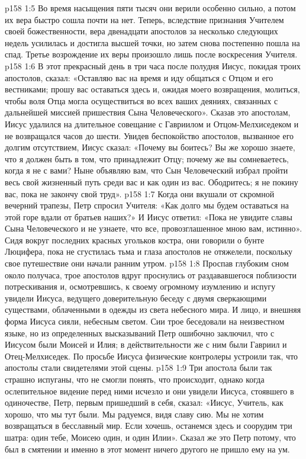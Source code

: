 \vs p158 1:5 Во время насыщения пяти тысяч они верили особенно сильно, а потом их вера быстро сошла почти на нет. Теперь, вследствие признания Учителем своей божественности, вера двенадцати апостолов за несколько следующих недель усилилась и достигла высшей точки, но затем снова постепенно пошла на спад. Третье возрождение их веры произошло лишь после воскресения Учителя.
\vs p158 1:6 В этот прекрасный день в три часа после полудня Иисус, покидая троих апостолов, сказал: «Оставляю вас на время и иду общаться с Отцом и его вестниками; прошу вас оставаться здесь и, ожидая моего возвращения, молиться, чтобы воля Отца могла осуществиться во всех ваших деяниях, связанных с дальнейшей миссией пришествия Сына Человеческого». Сказав это апостолам, Иисус удалился на длительное совещание с Гавриилом и Отцом\hyp{}Мелхиседеком и не возвращался часов до шести. Увидев беспокойство апостолов, вызванное его долгим отсутствием, Иисус сказал: «Почему вы боитесь? Вы же хорошо знаете, что я должен быть в том, что принадлежит Отцу; почему же вы сомневаетесь, когда я не с вами? Ныне объявляю вам, что Сын Человеческий избрал пройти весь свой жизненный путь среди вас и как один из вас. Ободритесь; я не покину вас, пока не закончу свой труд».
\vs p158 1:7 Когда они вкушали от скромной вечерний трапезы, Петр спросил Учителя: «Как долго мы будем оставаться на этой горе вдали от братьев наших?» И Иисус ответил: «Пока не увидите славы Сына Человеческого и не узнаете, что все, провозглашенное мною вам, истинно». Сидя вокруг последних красных угольков костра, они говорили о бунте Люцифера, пока не сгустилась тьма и глаза апостолов не отяжелели, поскольку свое путешествие они начали ранним утром.
\vs p158 1:8 Проспав глубоким сном около получаса, трое апостолов вдруг проснулись от раздававшегося поблизости потрескивания и, осмотревшись, к своему огромному изумлению и испугу увидели Иисуса, ведущего доверительную беседу с двумя сверкающими существами, облаченными в одежды из света небесного мира. И лицо, и внешняя форма Иисуса сияли, небесным светом. Сии трое беседовали на неизвестном языке, но из определенных высказываний Петр ошибочно заключил, что с Иисусом были Моисей и Илия; в действительности же с ним были Гавриил и Отец\hyp{}Мелхиседек. По просьбе Иисуса физические контролеры устроили так, что апостолы стали свидетелями этой сцены.
\vs p158 1:9 Три апостола были так страшно испуганы, что не смогли понять, что происходит, однако когда ослепительное видение перед ними исчезло и они увидели Иисуса, стоявшего в одиночестве, Петр, первым пришедший в себя, сказал: «Иисус, Учитель, как хорошо, что мы тут были. Мы радуемся, видя славу сию. Мы не хотим возвращаться в бесславный мир. Если хочешь, останемся здесь и соорудим три шатра: один тебе, Моисею один, и один Илии». Сказал же это Петр потому, что был в смятении и именно в этот момент ничего другого не пришло ему на ум.
